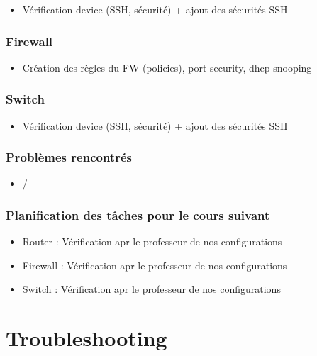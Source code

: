 \documentclass[a4paper,12pt]{article}
\begin{document}
\begin{itemize}

\item Vérification device (SSH, sécurité) + ajout des sécurités SSH
\end{itemize} 

\subsubsection{Firewall}

\begin{itemize}

\item Création des règles du FW (policies), port security, dhcp snooping

\end{itemize} 
\subsubsection{Switch}

\begin{itemize}

\item Vérification device (SSH, sécurité) + ajout des sécurités SSH
\end{itemize} 
\subsubsection{Problèmes rencontrés}
\begin{itemize}

\item /
\end{itemize} 
\subsubsection{Planification des tâches pour le cours suivant}
\begin{itemize}

\item Router : Vérification apr le professeur de nos configurations
\item Firewall : Vérification apr le professeur de nos configurations
\item Switch : Vérification apr le professeur de nos configurations


\end{itemize} 

\section{Troubleshooting}
\end{document}
